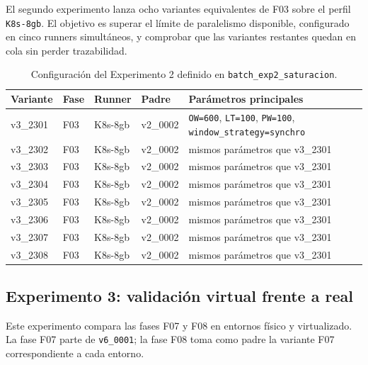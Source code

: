 El segundo experimento lanza ocho variantes equivalentes de F03 sobre el perfil \texttt{K8s-8gb}. El objetivo es superar el límite de paralelismo disponible, configurado en cinco runners simultáneos, y comprobar que las variantes restantes quedan en cola sin perder trazabilidad.

\begin{table}[htbp]
    \centering
    \caption{Configuración del Experimento 2 definido en \texttt{batch\_exp2\_saturacion}.}
    \label{tab:params-exp2-saturacion}
    \begin{tabular}{p{}p{}p{}p{}p{}}
        \hline
        \textbf{Variante} & \textbf{Fase} & \textbf{Runner} & \textbf{Padre} & \textbf{Parámetros principales} \\
        \hline
        v3\_2301 & F03 & K8s-8gb & v2\_0002 & \texttt{OW=600}, \texttt{LT=100}, \texttt{PW=100}, \texttt{window\_strategy=synchro} \\
        v3\_2302 & F03 & K8s-8gb & v2\_0002 & mismos parámetros que v3\_2301 \\
        v3\_2303 & F03 & K8s-8gb & v2\_0002 & mismos parámetros que v3\_2301 \\
        v3\_2304 & F03 & K8s-8gb & v2\_0002 & mismos parámetros que v3\_2301 \\
        v3\_2305 & F03 & K8s-8gb & v2\_0002 & mismos parámetros que v3\_2301 \\
        v3\_2306 & F03 & K8s-8gb & v2\_0002 & mismos parámetros que v3\_2301 \\
        v3\_2307 & F03 & K8s-8gb & v2\_0002 & mismos parámetros que v3\_2301 \\
        v3\_2308 & F03 & K8s-8gb & v2\_0002 & mismos parámetros que v3\_2301 \\
        \hline
    \end{tabular}
\end{table}

\subsection{Experimento 3: validación virtual frente a real}
\label{anexo:exp3-virtual-real}

Este experimento compara las fases F07 y F08 en entornos físico y virtualizado. La fase F07 parte de \texttt{v6\_0001}; la fase F08 toma como padre la variante F07 correspondiente a cada entorno.

